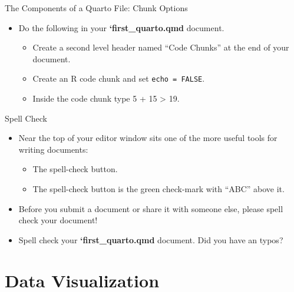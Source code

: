 \documentclass[
  ignorenonframetext,
]{beamer}
\providecommand{\tightlist}{%
  \setlength{\itemsep}{0pt}\setlength{\parskip}{0pt}}
\begin{document}
\begin{frame}[fragile]{The Components of a Quarto File: Chunk Options}
\protect\hypertarget{the-components-of-a-quarto-file-chunk-options-1}{}
\begin{itemize}
\item
  Do the following in your \textbf{`first\_quarto.qmd} document.

  \begin{itemize}
  \tightlist
  \item
    Create a second level header named ``Code Chunks'' at the end of
    your document.
  \item
    Create an R code chunk and set \texttt{echo\ =\ FALSE}.
  \item
    Inside the code chunk type 5 + 15 \textgreater{} 19.
  \end{itemize}
\end{itemize}
\end{frame}

\begin{frame}{Spell Check}
\protect\hypertarget{spell-check}{}
\begin{itemize}
\item
  Near the top of your editor window sits one of the more useful tools
  for writing documents:

  \begin{itemize}
  \tightlist
  \item
    The spell-check button.
  \item
    The spell-check button is the green check-mark with ``ABC'' above
    it.
  \end{itemize}
\item
  Before you submit a document or share it with someone else, please
  spell check your document!
\item
  Spell check your \textbf{`first\_quarto.qmd} document. Did you have an
  typos?
\end{itemize}
\end{frame}

\hypertarget{data-visualization}{%
\section{Data Visualization}\label{data-visualization}}
\end{document}
